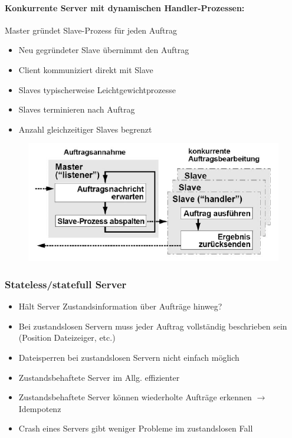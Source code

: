 \documentclass[10pt,a4paper]{article}
\begin{document}
\paragraph{Konkurrente Server mit dynamischen Handler-Prozessen: }Master gründet Slave-Prozess für jeden Auftrag
\begin{itemize}
\item Neu gegründeter Slave übernimmt den Auftrag
\item Client kommuniziert direkt mit Slave
\item Slaves typischerweise Leichtgewichtprozesse
\item Slaves terminieren nach Auftrag
\item Anzahl gleichzeitiger Slaves begrenzt
\end{itemize}
\begin{figure}[h]
\includegraphics[scale=0.5]{./Bilder/Konkurrente_Server_dynamische_handler_prozesse}
\end{figure}

\subsubsection{Stateless/statefull Server}
\begin{itemize}
\item Hält Server Zustandsinformation über Aufträge hinweg?
\item Bei zustandslosen Servern muss jeder Auftrag vollständig beschrieben sein (Position Dateizeiger, etc.)
\item Dateisperren bei zustandslosen Servern nicht einfach möglich
\item Zustandsbehaftete Server im Allg. effizienter
\item Zustandsbehaftete Server können wiederholte Aufträge erkennen $\rightarrow$ Idempotenz
\item Crash eines Servers gibt weniger Probleme im zustandslosen Fall
\end{itemize}
\end{document}
